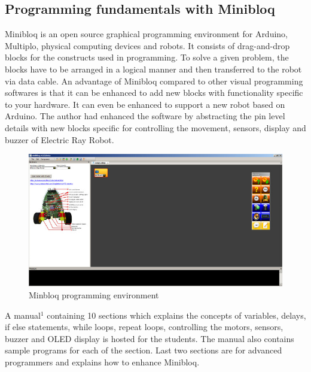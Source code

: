 \documentclass[conference]{IEEEtran}
\begin{document}
\thispagestyle{fancy}

\subsection{Programming fundamentals with Minibloq}
Minibloq is an open source graphical programming environment for Arduino, Multiplo, physical computing devices and robots. It consists of drag-and-drop blocks for the constructs used in programming. To solve a given problem, the blocks have to be arranged in a logical manner and then transferred to the robot via data cable. An advantage of Minibloq compared to other visual programming softwares is that it can be enhanced to add new blocks with functionality specific to your hardware. It can even be enhanced to support a new robot based on Arduino. The author had enhanced the software by abstracting the pin level details with new blocks specific for controlling the movement, sensors, display and buzzer of Electric Ray Robot.

\begin{figure}[h]
\centering
\includegraphics[scale=0.3]{Fig_08.png}
\caption{Minbloq programming environment}
\end{figure}

A manual$^1$ containing 10 sections which explains the concepts of variables, delays, if else statements, while loops, repeat loops, controlling the motors, sensors, buzzer and OLED display is hosted for the students. The manual also contains sample programs for each of the section. Last two sections are for advanced programmers and explains how to enhance Minibloq.
\end{document}
